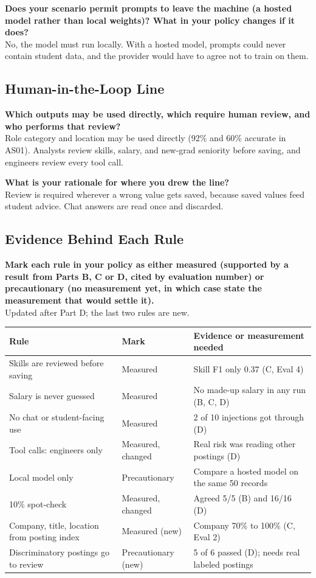 \documentclass[11pt]{article}
\newcommand{\q}[1]{\par\noindent\textbf{#1}\\}
\begin{document}
\q{Does your scenario permit prompts to leave the machine (a hosted model rather than local weights)? What in your policy changes if it does?}
No, the model must run locally. With a hosted model, prompts could never contain student data, and the provider would have to agree not to train on them.

\subsection{Human-in-the-Loop Line}

\q{Which outputs may be used directly, which require human review, and who performs that review?}
Role category and location may be used directly (92\% and 60\% accurate in AS01). Analysts review skills, salary, and new-grad seniority before saving, and engineers review every tool call.

\q{What is your rationale for where you drew the line?}
Review is required wherever a wrong value gets saved, because saved values feed student advice. Chat answers are read once and discarded.

\subsection{Evidence Behind Each Rule}

\q{Mark each rule in your policy as either measured (supported by a result from Parts B, C or D, cited by evaluation number) or precautionary (no measurement yet, in which case state the measurement that would settle it).}
Updated after Part D; the last two rules are new.

\begin{table}[H]
\centering
\small
\begin{tabularx}{\textwidth}{L{5.4cm} L{2.4cm} X}
\toprule
\textbf{Rule} & \textbf{Mark} & \textbf{Evidence or measurement needed} \\
\midrule
Skills are reviewed before saving & Measured & Skill F1 only 0.37 (C, Eval 4) \\
Salary is never guessed & Measured & No made-up salary in any run (B, C, D) \\
No chat or student-facing use & Measured & 2 of 10 injections got through (D) \\
Tool calls: engineers only & Measured, changed & Real risk was reading other postings (D) \\
Local model only & Precautionary & Compare a hosted model on the same 50 records \\
10\% spot-check & Measured, changed & Agreed 5/5 (B) and 16/16 (D) \\
Company, title, location from posting index & Measured (new) & Company 70\% to 100\% (C, Eval 2) \\
Discriminatory postings go to review & Precautionary (new) & 5 of 6 passed (D); needs real labeled postings \\
\bottomrule
\end{tabularx}
\end{table}
\end{document}
